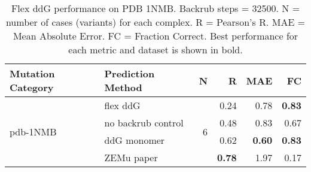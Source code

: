 \begin{table}
  \begin{tabular}{llrrrr}
\toprule
Mutation Category &   Prediction Method &  N &    R &  MAE &   FC \\
\midrule
 \multirow{ 4}{*}{pdb-1NMB} & flex ddG & \multirow{ 4}{*}{6} & 0.24 & 0.78 & \textbf{0.83}  \\
 & no backrub control & & 0.48 & 0.83 & 0.67  \\
 & ddG monomer & & 0.62 & \textbf{0.60} & \textbf{0.83}  \\
 & ZEMu paper & & \textbf{0.78} & 1.97 & 0.17  \\
\bottomrule
\end{tabular}
  \caption[Flex ddG performance on PDB 1NMB]{
    Flex ddG performance on PDB 1NMB. Backrub steps = 32500. N = number of cases (variants) for each complex. R = Pearson's R. MAE = Mean Absolute Error. FC = Fraction Correct. Best performance for each metric and dataset is shown in bold.
  } \label{tab:table-pdb-1NMB}
\end{table}
